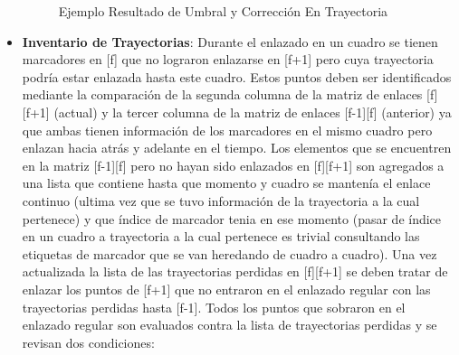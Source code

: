 \begin{itemize}
\begin{figure}[ht!]
 \centering
 \caption{Ejemplo Resultado de Umbral y Corrección En Trayectoria}
\label{distro_acc_track_m13_fix}
\end{figure}
\item \textbf{Inventario de Trayectorias}: Durante el enlazado en un cuadro se tienen marcadores en [f] que no lograron enlazarse en [f+1] pero cuya trayectoria podría estar enlazada hasta este cuadro.
Estos puntos deben ser identificados mediante la comparación de la segunda columna de la matriz de enlaces [f][f+1] (actual) y la tercer columna de la matriz de enlaces [f-1][f] (anterior) ya que ambas tienen información de los marcadores en el mismo cuadro pero enlazan hacia atrás y adelante en el tiempo.
Los elementos que se encuentren en la matriz [f-1][f] pero no hayan sido enlazados en [f][f+1] son agregados a una lista que contiene hasta que momento y cuadro se mantenía el enlace continuo (ultima vez que se tuvo información de la trayectoria a la cual pertenece) y que índice de marcador tenia en ese momento (pasar de índice en un cuadro a trayectoria a la cual pertenece es trivial consultando las etiquetas de marcador que se van heredando de cuadro a cuadro).
Una vez actualizada la lista de las trayectorias perdidas en [f][f+1] se deben tratar de enlazar los puntos de [f+1] que no entraron en el enlazado regular con las trayectorias perdidas hasta [f-1]. Todos los puntos que sobraron en el enlazado regular son evaluados contra la lista de trayectorias perdidas y se revisan dos condiciones:


\end{itemize}
